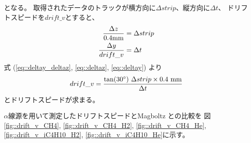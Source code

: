 となる。
取得されたデータのトラックが横方向に$\Delta strip$、縦方向に$\Delta t$、
ドリフトスピードを$drift\_v$とすると、
\begin{align}
  \frac{\Delta z}{0.4 {\rm mm}} & = \Delta strip \label{eq::deltaz}\\
  \frac{\Delta y}{drift\_v} & = \Delta t \label{eq::deltay}
\end{align}
式 (\ref{eq::deltay_deltaz}, \ref{eq::deltaz}, \ref{eq::deltay}) より
\begin{equation}
  drift\_v = \frac{\tan(30^{\circ})~\Delta strip\times0.4~{\rm mm}}{\Delta t}
\end{equation}
とドリフトスピードが求まる。

$\alpha$線源を用いて測定したドリフトスピードとMagboltz との比較を
図\ref{fig::drift_v_CH4}, \ref{fig::drift_v_CH4_H2}, \ref{fig::drift_v_CH4_He},
\ref{fig::drift_v_iC4H10_H2}, \ref{fig::drift_v_iC4H10_He}に示す。

